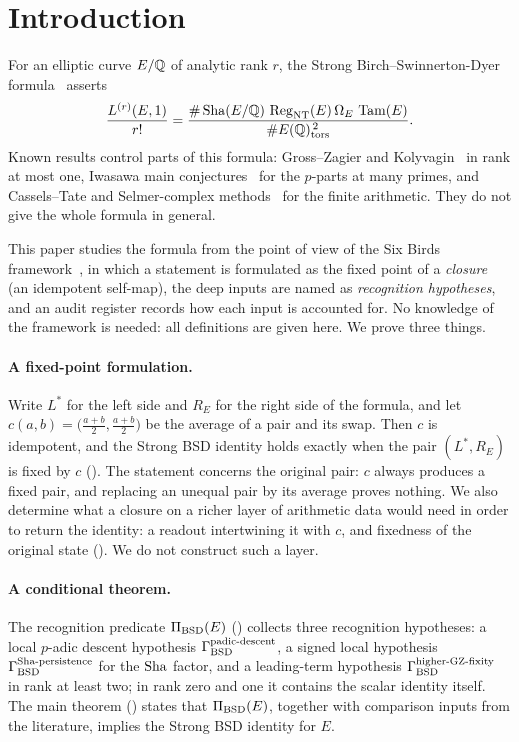 \section{Introduction}\label{sec:introduction}

For an elliptic curve $E/\mathbb{Q}$ of analytic rank $r$, the Strong
Birch--Swinnerton-Dyer formula~\citep{BirchSwinnertonDyer1965,Tate1966bsd}
asserts
\[
  \frac{L^{(r)}(E,1)}{r!}
  =
  \frac{\#\operatorname{Sha}(E/\mathbb{Q})\,\operatorname{Reg}_{\mathrm{NT}}(E)\,\Omega_E\,\operatorname{Tam}(E)}
       {\#E(\mathbb{Q})_{\operatorname{tors}}^{\,2}} .
\]
Known results control parts of this formula: Gross--Zagier and
Kolyvagin~\citep{GrossZagier1986,Kolyvagin1989} in rank at most one,
Iwasawa main conjectures~\citep{SkinnerUrban2014} for the $p$-parts at
many primes, and Cassels--Tate and Selmer-complex
methods~\citep{Flach1990,Nekovar2006} for the finite arithmetic.  They do
not give the whole formula in general.

This paper studies the formula from the point of view of the Six Birds
framework~\citep{TsiokosFoundationsIII2026,TsiokosAOR2026}, in which a
statement is formulated as the fixed point of a \emph{closure} (an
idempotent self-map), the deep inputs are named as \emph{recognition
hypotheses}, and an audit register records how each input is accounted
for.  No knowledge of the framework is needed: all definitions are given
here.  We prove three things.

\paragraph{A fixed-point formulation.}
Write $L^*$ for the left side and $R_E$ for the right side of the formula,
and let $c(a,b)=\bigl(\frac{a+b}2,\frac{a+b}2\bigr)$ be the average of a
pair and its swap.  Then $c$ is idempotent, and the Strong BSD identity
holds exactly when the pair $(L^*,R_E)$ is fixed by $c$
().  The statement concerns
the original pair: $c$ always produces a fixed pair, and replacing an
unequal pair by its average proves nothing.  We also determine what a
closure on a richer layer of arithmetic data would need in order to
return the identity: a readout intertwining it with $c$, and fixedness of
the original state ().  We do not
construct such a layer.

\paragraph{A conditional theorem.}
The recognition predicate $\Pi_{\mathrm{BSD}}(E)$ ()
collects three recognition hypotheses: a local $p$-adic descent
hypothesis $\Gamma_{\mathrm{BSD}}^{\mathrm{padic\text{-}descent}}$, a signed local hypothesis $\Gamma_{\mathrm{BSD}}^{\mathrm{Sha\text{-}persistence}}$ for the
$\operatorname{Sha}$ factor, and a leading-term hypothesis $\Gamma_{\mathrm{BSD}}^{\mathrm{higher\text{-}GZ\text{-}fixity}}$ in rank at least
two; in rank zero and one it contains the scalar identity itself.  The
main theorem () states that
$\Pi_{\mathrm{BSD}}(E)$, together with comparison inputs from the literature, implies
the Strong BSD identity for $E$.

